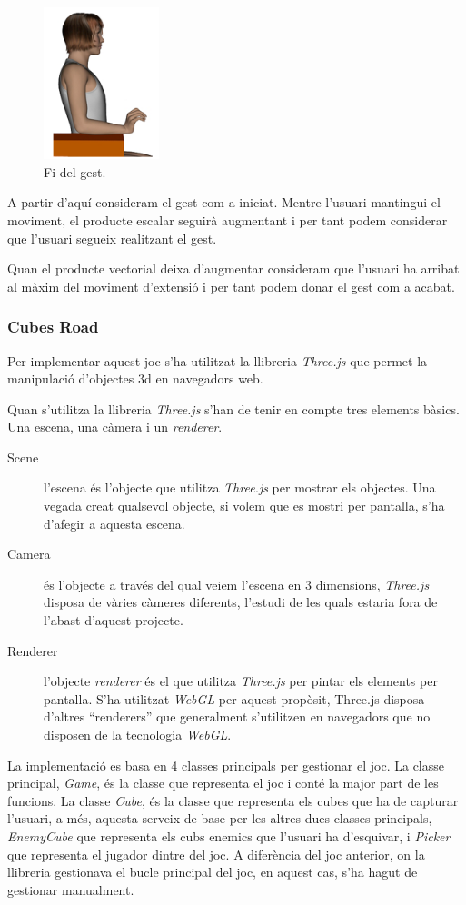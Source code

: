 \documentclass[12pt,a4paper,catalan]{article}
\begin{document}
	\begin{figure}
		\centering
		\includegraphics[width=0.3\textwidth]{hand-extension-end.png}
		\caption{Fi del gest.}
		\label{fig:hand-up-end}
	\end{figure}
	
	A partir d'aquí consideram el gest com a iniciat. Mentre l'usuari mantingui el moviment, el producte escalar seguirà augmentant i per tant podem considerar que l'usuari segueix realitzant el gest.
	
	Quan el producte vectorial deixa d'augmentar consideram que l'usuari ha arribat al màxim del moviment d'extensió i per tant podem donar el gest com a acabat.
	\clearpage
	\subsubsection{Cubes Road}
	Per implementar aquest joc s'ha utilitzat la llibreria \textit{Three.js} que permet la manipulació d'objectes 3d en navegadors web.
	
	Quan s'utilitza la llibreria \textit{Three.js} s'han de tenir en compte tres elements bàsics. Una escena, una càmera i un \textit{renderer}.
	\begin{description}
		\item[Scene] l'escena és l'objecte que utilitza \textit{Three.js} per mostrar els objectes. Una vegada creat qualsevol objecte, si volem que es mostri per pantalla, s'ha d'afegir a aquesta escena.
		\item[Camera] és l'objecte a través del qual veiem l'escena en 3 dimensions, \textit{Three.js} disposa de vàries càmeres diferents, l'estudi de les quals estaria fora de l'abast d'aquest projecte.
		\item[Renderer] l'objecte \textit{renderer} és el que utilitza \textit{Three.js} per pintar els elements per pantalla. S'ha utilitzat \textit{WebGL} per aquest propòsit, Three.js disposa d'altres “renderers” que generalment s'utilitzen en navegadors que no disposen de la tecnologia \textit{WebGL}.
	\end{description}
	La implementació es basa en 4 classes principals per gestionar el joc. La classe principal, \textit{Game}, és la classe que representa el joc i conté la major part de les funcions. La classe \textit{Cube}, és la classe que representa els cubes que ha de capturar l'usuari, a més, aquesta serveix de base per les altres dues classes principals, \textit{EnemyCube} que representa els cubs enemics que l'usuari ha d'esquivar, i \textit{Picker} que representa el jugador dintre del joc.
	A diferència del joc anterior, on la llibreria gestionava el bucle principal del joc, en aquest cas, s'ha hagut de gestionar manualment.
	
\end{document}
